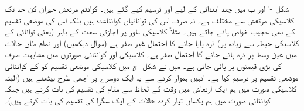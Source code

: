  شکل -ا   اور ب میں  چند ابتدائی  کے لیے  اور   ترسیم کیے گئے ہیں۔ کوانٹم مرتعش حیران کن حد تک کلاسیکی  مرتعش سے مختلف ہے۔ نہ صرف اس کی توانائیاں کوانٹاشدہ ہیں بلکہ اس کی  موضعی تقسیم  کے بھی عجیب خواص پائے جاتے ہیں۔ مثلاً  کلاسیکی طور پر اجازتی سعت کے باہر (یعنی توانائی کے کلاسیکی حیطہ سے زیادہ  پر) ذرہ پایا جانے کا احتمال غیر صفر ہے (سوال  دیکھیں) اور تمام طاق حالات میں عین وسط پر ذرہ پائے جانے کا احتمال صفر ہے۔ کلاسیکی اور کوانٹائی صورتوں میں مشابہت صرف  کی بڑی قیمتوں پر  پائی جاتی ہے۔ میں نے شکل -ج  میں   کلاسیکی موضعی تقسیم کو  کے  کوانٹائی موضعی تقسیم پر ترسیم کیا ہے۔ انہیں ہموار کرنے سے یہ ایک دوسرے پر اچھی طرح بیٹھتے ہیں (البتہ  کلاسیکی صورت میں ہم ایک ارتعاش میں وقت کے لحاظ سے مقام کی تقسیم  کی بات کرتے ہیں جبکہ کوانٹائی صورت میں ہم  یکساں تیار کردہ حالات کے ایک سگرا کی تقسیم کی بات کرتے ہیں)۔
